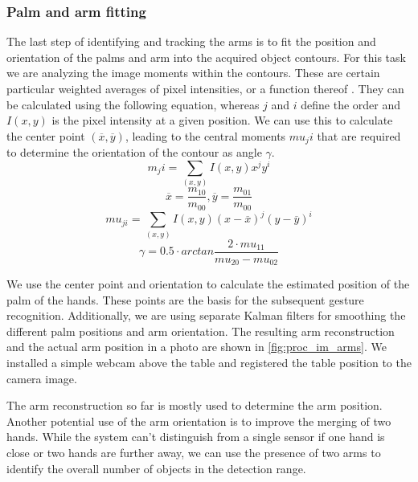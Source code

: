 \subsubsection{Palm and arm fitting}
The last step of identifying and tracking the arms is to fit the position and orientation of the palms and arm into the acquired object contours. For this task we are analyzing the image moments within the contours. These are certain particular weighted averages of pixel intensities, or a function thereof \cite{hu1962visual}. They can be calculated using the following equation, whereas $j$ and $i$ define the order and $I(x,y)$ is the pixel intensity at a given position. We can use this to calculate the center point $(\overline{x},\overline{y})$, leading to the central moments $mu_ji$ that are required to determine the orientation of the contour as angle $\gamma$.
\begin{equation}
m_ji=\sum_{(x,y)}{I(x,y)x^jy^i}
\end{equation}
\begin{equation}
\overline{x}=\frac{m_10}{m_00}, \overline{y}=\frac{m_01}{m_00}
\end{equation}
\begin{equation}
mu_{ji}=\sum_{(x,y)}{I(x,y)(x-\overline{x})^j(y-\overline{y})^i}
\end{equation}
\begin{equation}
\gamma=0.5\cdot arctan\frac{2\cdot{mu_{11}}}{mu_{20}-mu_{02}}
\end{equation}
 
We use the center point and orientation to calculate the estimated position of the palm of the hands. These points are the basis for the subsequent gesture recognition. Additionally, we are using separate Kalman filters for smoothing the different palm positions and arm orientation. The resulting arm reconstruction and the actual arm position in a photo are shown in \ref{fig:proc_im_arms}. We installed a simple webcam above the table and registered the table position to the camera image. 

The arm reconstruction so far is mostly used to determine the arm position. Another potential use of the arm orientation is to improve the merging of two hands. While the system can't distinguish from a single sensor if one hand is close or two hands are further away, we can use the presence of two arms to identify the overall number of objects in the detection range. 
